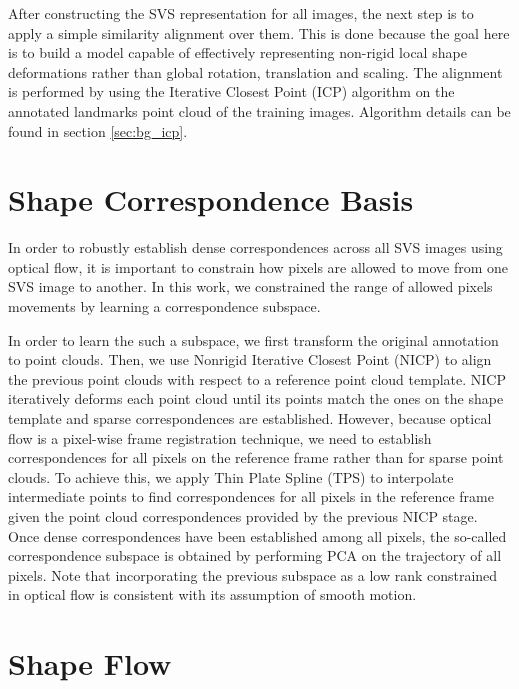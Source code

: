 After constructing the SVS representation for all images, the next step is to apply a simple similarity alignment over them. This is done because the goal here is to build a model capable of effectively representing non-rigid local shape deformations rather than global rotation, translation and scaling. The alignment is performed by using the Iterative Closest Point (ICP) algorithm \cite{Besl1992} on the annotated landmarks point cloud of the training images. Algorithm details can be found in section \ref{sec:bg_icp}.


\section{Shape Correspondence Basis}

In order to robustly establish dense correspondences across all SVS images using optical flow, it is important to constrain how pixels are allowed to move from one SVS image to another. In this work, we constrained the range of allowed pixels movements by learning a correspondence subspace. 

In order to learn the such a subspace, we first transform the original annotation to point clouds. Then, we use Nonrigid Iterative Closest Point (NICP) to align the previous point clouds with respect to a reference point cloud template. NICP iteratively deforms each point cloud until its points match the ones on the shape template and sparse correspondences are established. However, because optical flow is a pixel-wise frame registration technique, we need to establish correspondences for all pixels on the reference frame rather than for sparse point clouds. To achieve this, we apply Thin Plate Spline (TPS) \cite{Bookstein1989} to interpolate intermediate points to find correspondences for all pixels in the reference frame given the point cloud correspondences provided by the previous NICP stage. Once dense correspondences have been established among all pixels, the so-called correspondence subspace is obtained by performing PCA on the trajectory of all pixels. Note that incorporating the previous subspace as a low rank constrained in optical flow is consistent with its assumption of smooth motion.




\section{Shape Flow}
\label{sec:shapeflow}

